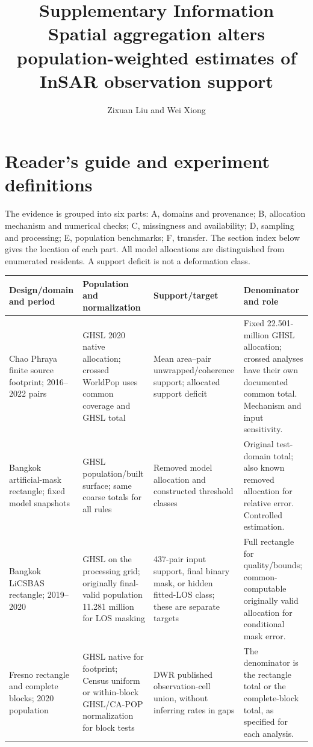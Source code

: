 \documentclass[10pt,a4paper]{article}
\title{Supplementary Information\\Spatial aggregation alters population-weighted estimates of InSAR observation support}
\author{Zixuan Liu and Wei Xiong}
\date{}
\begin{document}
\maketitle
\section*{Reader's guide and experiment definitions}
The evidence is grouped into six parts: A, domains and provenance; B, allocation mechanism and numerical checks; C, missingness and availability; D, sampling and processing; E, population benchmarks; F, transfer. The section index below gives the location of each part. All model allocations are distinguished from enumerated residents. A support deficit is not a deformation class.

\small\setlength{\tabcolsep}{4pt}
\begin{longtable}{p{.16\linewidth}p{.25\linewidth}p{.27\linewidth}p{.24\linewidth}}
\toprule Design/domain and period & Population and normalization & Support/target & Denominator and role\\\midrule\endhead
Chao Phraya finite source footprint; 2016--2022 pairs & GHSL 2020 native allocation; crossed WorldPop uses common coverage and GHSL total & Mean area--pair unwrapped/coherence support; allocated support deficit & Fixed 22.501-million GHSL allocation; crossed analyses have their own documented common total. Mechanism and input sensitivity.\\
Bangkok artificial-mask rectangle; fixed model snapshots & GHSL population/built surface; same coarse totals for all rules & Removed model allocation and constructed threshold classes & Original test-domain total; also known removed allocation for relative error. Controlled estimation.\\
Bangkok LiCSBAS rectangle; 2019--2020 & GHSL on the processing grid; originally final-valid population 11.281 million for LOS masking & 437-pair input support, final binary mask, or hidden fitted-LOS class; these are separate targets & Full rectangle for quality/bounds; common-computable originally valid allocation for conditional mask error.\\
Fresno rectangle and complete blocks; 2020 population & GHSL native for footprint; Census uniform or within-block GHSL/CA-POP normalization for block tests & DWR published observation-cell union, without inferring rates in gaps & The denominator is the rectangle total or the complete-block total, as specified for each analysis.\\

\end{longtable}
\end{document}
